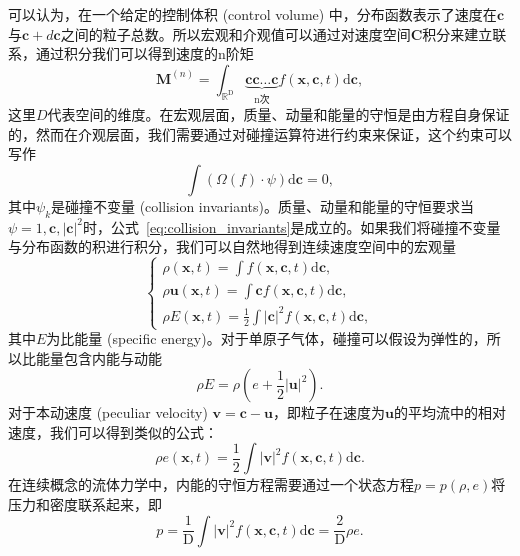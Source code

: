 可以认为，在一个给定的控制体积 (control volume) 中，分布函数表示了速度在$\mathbf{c}$与$\mathbf{c}+d\mathbf{c}$之间的粒子总数。所以宏观和介观值可以通过对速度空间$\mathbf{C}$积分来建立联系，通过积分我们可以得到速度的n阶矩
\begin{equation}
    \boldsymbol{M}^{(n)}=\int_{\mathbb{R}^{\mathrm{D}}} \underbrace{\mathbf{c} \mathbf{c} \ldots \mathbf{c}}_{\mathrm{n} \text {次}} f(\boldsymbol{x}, \mathbf{c}, t) \mathrm{d} \mathbf{c},
\end{equation}
这里$D$代表空间的维度。在宏观层面，质量、动量和能量的守恒是由方程自身保证的，然而在介观层面，我们需要通过对碰撞运算符进行约束来保证，这个约束可以写作
\begin{equation}
    \int\left(\Omega(f) \cdot \psi\right) \mathrm{d} \mathbf{c}=0,
    \label{eq:collision_invariants}
\end{equation}
其中$\psi_k$是碰撞不变量 (collision invariants)。质量、动量和能量的守恒要求当$\psi=1, \mathbf{c}, |\mathbf{c}|^2$时，公式~\ref{eq:collision_invariants}是成立的。如果我们将碰撞不变量与分布函数的积进行积分，我们可以自然地得到连续速度空间中的宏观量
\begin{equation}
    \left\{
        \begin{array}
        {l}\rho(\boldsymbol{x}, t)=\int f(\boldsymbol{x}, \mathbf{c}, t) \mathrm{d} \mathbf{c} , \\
        \rho \boldsymbol{u}(\boldsymbol{x}, t)=\int \mathbf{c} f(\boldsymbol{x}, \mathbf{c}, t) \mathrm{d} \mathbf{c} , \\
        \rho E(\boldsymbol{x}, t)=\frac{1}{2} \int|\mathbf{c}|^2 f(\boldsymbol{x}, \mathbf{c}, t) \mathrm{d} \mathbf{c} ,
        \end{array}
    \right.
\end{equation}
其中$E$为比能量 (specific energy)。对于单原子气体，碰撞可以假设为弹性的，所以比能量包含内能与动能
\begin{equation}
    \rho E=\rho\left(e+\frac{1}{2}|\boldsymbol{u}|^2\right).
\end{equation}
对于本动速度 (peculiar velocity) $\boldsymbol{v}=\mathbf{c}-\boldsymbol{u}$，即粒子在速度为$\boldsymbol{u}$的平均流中的相对速度，我们可以得到类似的公式：
\begin{equation}
    \rho e(\boldsymbol{x}, t)=\frac{1}{2} \int|\boldsymbol{v}|^2 f(\boldsymbol{x}, \mathbf{c}, t) \mathrm{d} \mathbf{c}.
\end{equation}
在连续概念的流体力学中，内能的守恒方程需要通过一个状态方程$p=p(\rho,e)$将压力和密度联系起来，即
\begin{equation}
    p=\frac{1}{\mathrm{D}} \int|\boldsymbol{v}|^2 f(\boldsymbol{x}, \mathbf{c}, t) \mathrm{d} \mathbf{c}=\frac{2}{\mathrm{D}} \rho e.
    \label{eq:eos}
\end{equation}
